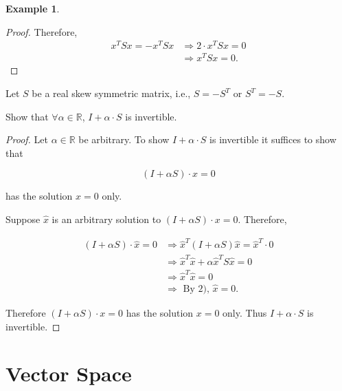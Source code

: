\documentclass[12pt]{article}
\theoremstyle{definition}
\newtheorem*{example}{Example}
\begin{document}
\begin{example}
\begin{enumerate}[label = (\arabic*)]
\begin{proof}
Therefore, 
\begin{align*}
x^TSx = -x^TSx &\Rightarrow 2 \cdot x^T S x = 0 \\
&\Rightarrow x^TSx = 0.
\end{align*}
\end{proof}
\end{enumerate}

Let $S$ be a real skew symmetric matrix, i.e., $S = -S^T$ or $S^T = -S$.

Show that $\forall \alpha \in \mathbb{R}$, $I + \alpha \cdot S$ is invertible.

\begin{proof}
Let $\alpha \in \mathbb{R}$ be arbitrary. To show $I + \alpha \cdot S$ is invertible
it suffices to show that 

\[
(I + \alpha S) \cdot x = 0
\]

has the solution $x = 0$ only.

Suppose $\hat{x}$ is an arbitrary solution to $(I + \alpha S) \cdot x = 0$. Therefore,

\begin{align*}
(I + \alpha S) \cdot \hat{x} = 0 &\Rightarrow \hat{x}^T (I + \alpha S) \hat{x} = \hat{x}^T \cdot 0 \\
&\Rightarrow \hat{x}^T \hat{x} + \alpha \hat{x}^T S \hat{x} = 0 \\
&\Rightarrow \hat{x}^T \hat{x} = 0 \\
&\Rightarrow \text{ By 2), } \hat{x} = 0.
\end{align*}

Therefore $(I + \alpha S) \cdot x = 0$ has the solution $x = 0$ only. Thus $I + \alpha \cdot S$ is
invertible.
\end{proof}

\end{example}


\section{Vector Space}
\end{document}
